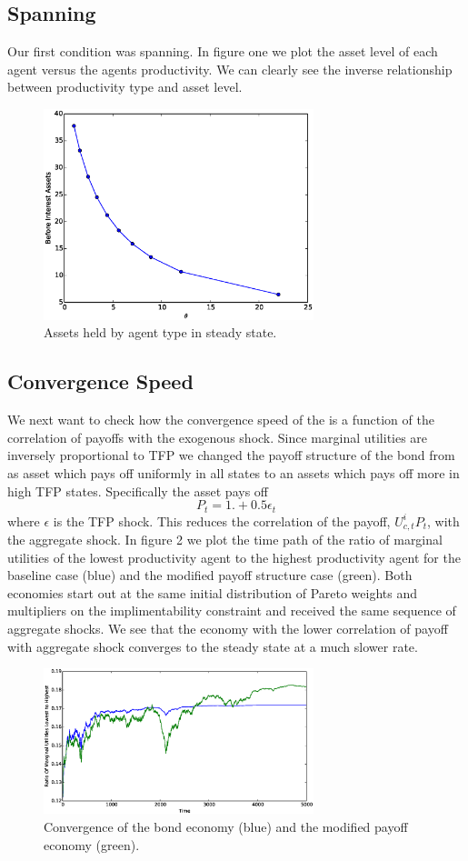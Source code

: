 \documentclass[thmsb,11pt]{article}
\begin{document}
\subsection{Spanning}  Our first condition was spanning.  In figure one we plot the asset level of each agent versus the agents productivity.  We can clearly see the inverse relationship between productivity type and asset level.
\begin{figure}[htcp]
\centering
\includegraphics[width=0.7\textwidth]{Images/spanning.eps}
\caption{Assets held by agent type in steady state.}
\end{figure}
\subsection{Convergence Speed}
We next want to check how the convergence speed of the is a function of the correlation of payoffs with the exogenous shock.  Since marginal utilities are inversely proportional to TFP we changed the payoff structure of the bond from as asset which pays off uniformly in all states to an assets which pays off more in high TFP states.  Specifically the asset pays off
\[
	P_t = 1. + 0.5\epsilon_t
\]where $\epsilon$ is the TFP shock.   This reduces the correlation of the payoff, $U^i_{c,t}P_t$, with the aggregate shock.  In figure 2 we plot the time path of the ratio of marginal utilities of the lowest productivity agent to the highest productivity agent for the baseline case (blue) and the modified payoff structure case (green).  Both economies start out at the same initial distribution of Pareto weights and multipliers on the implimentability  constraint and received the same sequence of aggregate shocks.  We see that the economy with the lower correlation of payoff with aggregate shock converges to the steady state at a much slower rate.
\begin{figure}[htp]
	\centering
	\includegraphics[width=0.7\textwidth]{Images/convergence.eps}
	\caption{Convergence of the bond economy (blue) and the modified payoff economy (green).}
\end{figure}
\newpage
\end{document}
